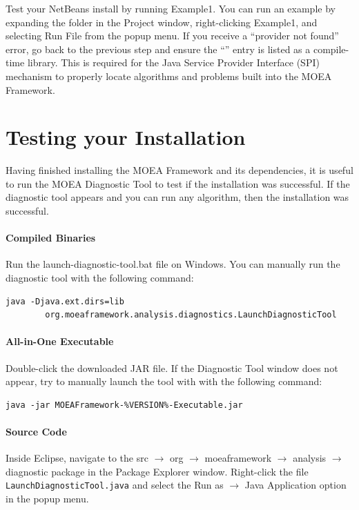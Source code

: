 \begin{important}
Test your NetBeans install by running Example1.  You can run an example by expanding the  folder in the Project window, right-clicking Example1, and selecting Run File from the popup menu.  If you receive a ``provider not found'' error, go back to the previous step and ensure the ``'' entry is listed as a compile-time library.  This is required for the Java Service Provider Interface (SPI) mechanism to properly locate algorithms and problems built into the MOEA Framework.
\end{important}

\section{Testing your Installation}
Having finished installing the MOEA Framework and its dependencies, it is useful to run the MOEA Diagnostic Tool to test if the installation was successful.  If the diagnostic tool appears and you can run any algorithm, then the installation was successful.

\paragraph{Compiled Binaries}
Run the launch-diagnostic-tool.bat file on Windows.  You can manually run the diagnostic tool with the following command:

\begin{lstlisting}[language=Plaintext]
java -Djava.ext.dirs=lib
		org.moeaframework.analysis.diagnostics.LaunchDiagnosticTool
\end{lstlisting}

\paragraph{All-in-One Executable}
Double-click the downloaded JAR file.  If the Diagnostic Tool window does not appear, try to manually launch the tool with with the following command:

\begin{lstlisting}[language=Plaintext]
java -jar MOEAFramework-%VERSION%-Executable.jar
\end{lstlisting}

\paragraph{Source Code}
Inside Eclipse, navigate to the src $\rightarrow$ org $\rightarrow$ moeaframework $\rightarrow$ analysis $\rightarrow$ diagnostic package in the Package Explorer window.  Right-click the file \texttt{LaunchDiagnosticTool.java} and select the Run as $\rightarrow$ Java Application option in the popup menu.

